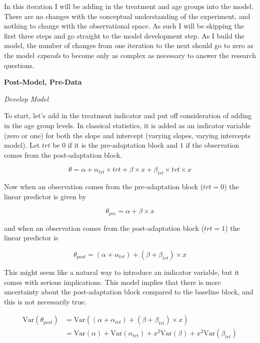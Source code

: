 \documentclass[11pt, oneside, openany]{scrbook}
\begin{document}
In this iteration I will be adding in the treatment and age groups into the model. There are no changes with the conceptual understanding of the experiment, and nothing to change with the observational space. As such I will be skipping the first three steps and go straight to the model development step. As I build the model, the number of changes from one iteration to the next should go to zero as the model \emph{expands} to become only as complex as necessary to answer the research questions.

\textbf{Post-Model, Pre-Data}

\emph{Develop Model}

To start, let's add in the treatment indicator and put off consideration of adding in the age group levels. In classical statistics, it is added as an indicator variable (zero or one) for both the slope and intercept (varying slopes, varying intercepts model). Let \(trt\) be \(0\) if it is the pre-adaptation block and \(1\) if the observation comes from the post-adaptation block.


\[
\theta = \alpha + \alpha_{trt} \times trt + \beta \times x + \beta_{trt}\times trt \times x
\]

Now when an observation comes from the pre-adaptation block (\(trt=0\)) the linear predictor is given by


\[
\theta_{pre} = \alpha + \beta \times x
\]

and when an observation comes from the post-adaptation block (\(trt=1\)) the linear predictor is


\[
\theta_{post} = (\alpha + \alpha_{trt}) + (\beta + \beta_{trt}) \times x
\]

This might seem like a natural way to introduce an indicator variable, but it comes with serious implications. This model implies that there is more uncertainty about the post-adaptation block compared to the baseline block, and this is not necessarily true.


\begin{align*}
\mathrm{Var}(\theta_{post}) &= \mathrm{Var}((\alpha + \alpha_{trt}) + (\beta + \beta_{trt}) \times x) \\
&= \mathrm{Var}(\alpha) + \mathrm{Var}(\alpha_{trt}) + x^2 \mathrm{Var}(\beta) + x^2\mathrm{Var}(\beta_{trt})
\end{align*}
\end{document}
